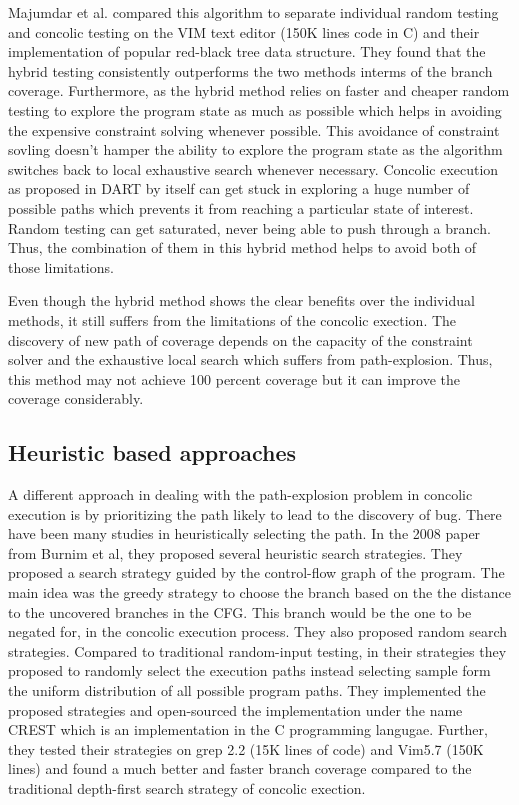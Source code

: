 \documentclass[	runningheads,
				a4paper]{llncs}
\begin{document}
Majumdar et al. \cite{majumdar2007hybrid} compared this algorithm to separate individual random testing and concolic testing on the VIM text editor (150K lines code in C) and their implementation of popular red-black tree data structure. They found that the hybrid testing consistently outperforms the two methods interms of the branch coverage. Furthermore, as the hybrid method relies on faster and cheaper random testing to explore the program state as much as possible which helps in avoiding the expensive constraint solving whenever possible. This avoidance of constraint sovling doesn't hamper the ability to explore the program state as the algorithm switches back to local exhaustive search whenever necessary. Concolic execution as proposed in DART \cite{godefroid2005dart} by itself can get stuck in exploring a huge number of possible paths which prevents it from reaching a particular state of interest. Random testing can get saturated, never being able to push through a branch. Thus, the combination of them in this hybrid method helps to avoid both of those limitations. 

Even though the hybrid method shows the clear benefits over the individual methods, it still suffers from the limitations of the concolic exection. The discovery of new path of coverage depends on the capacity of the constraint solver and the exhaustive local search which suffers from path-explosion. Thus, this method may not achieve 100 percent coverage but it can improve the coverage considerably.


\subsection{Heuristic based approaches}
A different approach in dealing with the path-explosion problem in concolic execution is by prioritizing the path likely to lead to the discovery of bug. There have been many studies in heuristically selecting the path. In the 2008 paper \cite{kousik2008heuristic} from Burnim et al, they proposed several heuristic search strategies. They proposed a search strategy guided by the control-flow graph of the program. The main idea was the greedy strategy to choose the branch based on the the distance to the uncovered branches in the CFG. This branch would be the one to be negated for, in the concolic execution process. They also proposed random search strategies. Compared to traditional random-input testing, in their strategies they proposed to randomly select the execution paths instead selecting sample form the uniform distribution of all possible program paths. They implemented the proposed strategies and open-sourced the implementation under the name CREST which is an implementation in the C programming langugae. Further, they tested their strategies on grep 2.2 (15K lines of code) and Vim5.7 (150K lines) and found a much better and faster branch coverage compared to the traditional depth-first search strategy of concolic exection. 
\end{document}
